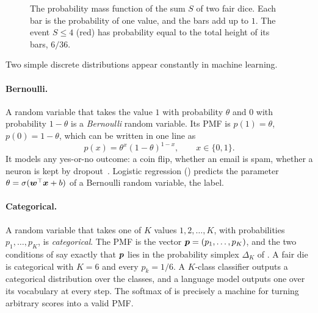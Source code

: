 \begin{figure}[ht]
  \centering
  \caption{The probability mass function of the sum $S$ of two fair
    dice. Each bar is the probability of one value, and the bars add up
    to $1$. The event $S \le 4$ (red) has probability equal to the total
    height of its bars, $6/36$.}
  \label{fig:ch05-dice-pmf}
\end{figure}

Two simple discrete distributions appear constantly in machine learning.

\paragraph{Bernoulli.}
A random variable that takes the value $1$ with probability $\theta$ and
$0$ with probability $1 - \theta$ is a \emph{Bernoulli} random variable.
Its PMF is $p(1) = \theta$, $p(0) = 1 - \theta$, which can be written in
one line as
\[
  p(x) = \theta^x (1 - \theta)^{1 - x}, \qquad x \in \{0, 1\}.
\]
It models any yes-or-no outcome: a coin flip, whether an email is spam,
whether a neuron is kept by dropout~\cite{srivastava2014dropout}.
Logistic regression
() predicts the parameter $\theta =
\sigma(\bm{w}^\top\bm{x} + b)$ of a Bernoulli random variable, the
label.

\paragraph{Categorical.}
A random variable that takes one of $K$ values $1, 2, \dots, K$, with
probabilities $p_1, \dots, p_K$, is \emph{categorical}. The PMF is the
vector $\bm{p} = (p_1, \dots, p_K)$, and the two conditions of
 say exactly that $\bm{p}$ lies in the probability
simplex $\Delta_K$ of . A fair die is
categorical with $K = 6$ and every $p_k = 1/6$. A $K$-class classifier
outputs a categorical distribution over the classes, and a language
model outputs one over its vocabulary at every step. The softmax of
 is precisely a machine for turning arbitrary
scores into a valid PMF.

